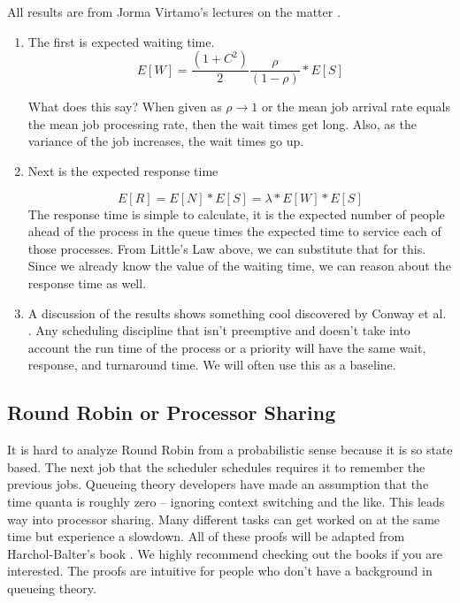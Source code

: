 All results are from Jorma Virtamo's lectures on the matter \cite{virtamo}.

\begin{enumerate}
\item The first is expected waiting time.
  \[
  E[W] = \frac{(1 + C^2)}{2}\frac{\rho}{(1 - \rho)} * E[S]
  \]

  What does this say? When given as $\rho \rightarrow 1$ or the mean job arrival rate equals the mean job processing rate, then the wait times get long.
  Also, as the variance of the job increases, the wait times go up.

\item Next is the expected response time

  \[
  E[R] = E[N] * E[S] = \lambda * E[W] * E[S]
  \]
  The response time is simple to calculate, it is the expected number of people ahead of the process in the queue times the expected time to service each of those processes.
  From Little's Law above, we can substitute that for this. Since we already know the value of the waiting time, we can reason about the response time as well.
\item A discussion of the results shows something cool discovered by Conway et al. \cite{conway1967theory}.
  Any scheduling discipline that isn't preemptive and doesn't take into account the run time of the process or a priority will have the same wait, response, and turnaround time.
  We will often use this as a baseline.
\end{enumerate}

\subsection{Round Robin or Processor Sharing}

It is hard to analyze Round Robin from a probabilistic sense because it is so state based.
The next job that the scheduler schedules requires it to remember the previous jobs.
Queueing theory developers have made an assumption that the time quanta is roughly zero -- ignoring context switching and the like.
This leads way into processor sharing.
Many different tasks can get worked on at the same time but experience a slowdown.
All of these proofs will be adapted from Harchol-Balter's book \cite{harchol2013performance}.
We highly recommend checking out the books if you are interested.
The proofs are intuitive for people who don't have a background in queueing theory.

